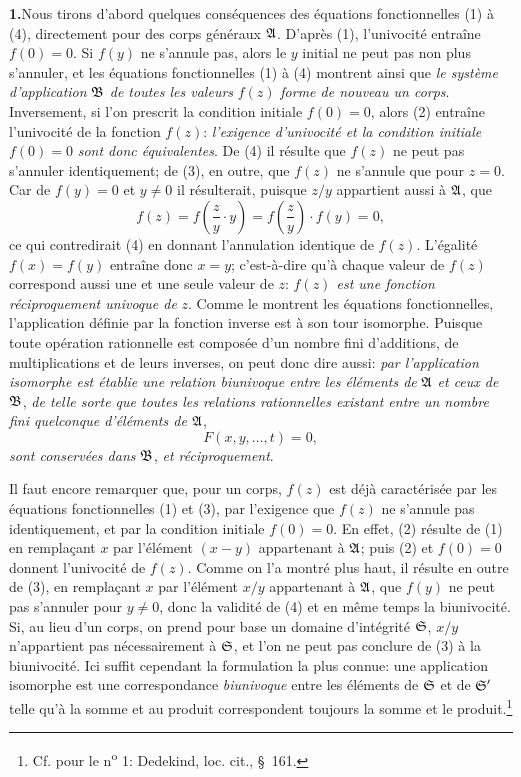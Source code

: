 \medskip
\noindent\textbf{1.}\quad Nous tirons d'abord quelques conséquences des équations fonctionnelles (1) à (4), directement pour des corps généraux $\mathfrak{A}$. D'après (1), l'univocité entraîne $f(0)=0$. Si $f(y)$ ne s'annule pas, alors le $y$ initial ne peut pas non plus s'annuler, et les équations fonctionnelles (1) à (4) montrent ainsi que \emph{le système d'application} $\mathfrak{B}$ \emph{de toutes les valeurs} $f(z)$ \emph{forme de nouveau un corps}. Inversement, si l'on prescrit la condition initiale $f(0)=0$, alors (2) entraîne l'univocité de la fonction $f(z)$: \emph{l'exigence d'univocité et la condition initiale} $f(0)=0$ \emph{sont donc équivalentes}. De (4) il résulte que $f(z)$ ne peut pas s'annuler identiquement; de (3), en outre, que $f(z)$ ne s'annule que pour $z=0$. Car de $f(y)=0$ et $y\ne0$ il résulterait, puisque $z/y$ appartient aussi à $\mathfrak{A}$, que
\[
f(z)=f\!\left(\frac{z}{y}\cdot y\right)=f\!\left(\frac{z}{y}\right)\cdot f(y)=0,
\]
ce qui contredirait (4) en donnant l'annulation identique de $f(z)$. L'égalité $f(x)=f(y)$ entraîne donc $x=y$; c'est-à-dire qu'à chaque valeur de $f(z)$ correspond aussi une et une seule valeur de $z$: \emph{$f(z)$ est une fonction réciproquement univoque de} $z$. Comme le montrent les équations fonctionnelles, l'application définie par la fonction inverse est à son tour isomorphe. Puisque toute opération rationnelle est composée d'un nombre fini d'additions, de multiplications et de leurs inverses, on peut donc dire aussi: \emph{par l'application isomorphe est établie une relation biunivoque entre les éléments de} $\mathfrak{A}$ \emph{et ceux de} $\mathfrak{B}$, \emph{de telle sorte que toutes les relations rationnelles existant entre un nombre fini quelconque d'éléments de} $\mathfrak{A}$,
\[
F(x,y,\ldots,t)=0,
\]
\emph{sont conservées dans} $\mathfrak{B}$, \emph{et réciproquement}.

Il faut encore remarquer que, pour un corps, $f(z)$ est déjà caractérisée par les équations fonctionnelles (1) et (3), par l'exigence que $f(z)$ ne s'annule pas identiquement, et par la condition initiale $f(0)=0$. En effet, (2) résulte de (1) en remplaçant $x$ par l'élément $(x-y)$ appartenant à $\mathfrak{A}$; puis (2) et $f(0)=0$ donnent l'univocité de $f(z)$. Comme on l'a montré plus haut, il résulte en outre de (3), en remplaçant $x$ par l'élément $x/y$ appartenant à $\mathfrak{A}$, que $f(y)$ ne peut pas s'annuler pour $y\ne0$, donc la validité de (4) et en même temps la biunivocité. Si, au lieu d'un corps, on prend pour base un domaine d'intégrité $\mathfrak{S}$, $x/y$ n'appartient pas nécessairement à $\mathfrak{S}$, et l'on ne peut pas conclure de (3) à la biunivocité. Ici suffit cependant la formulation la plus connue: une application isomorphe est une correspondance \emph{biunivoque} entre les éléments de $\mathfrak{S}$ et de $\mathfrak{S}'$ telle qu'à la somme et au produit correspondent toujours la somme et le produit.\footnote{Cf. pour le n\textsuperscript{o} 1: Dedekind, loc. cit., \S\ 161.}

